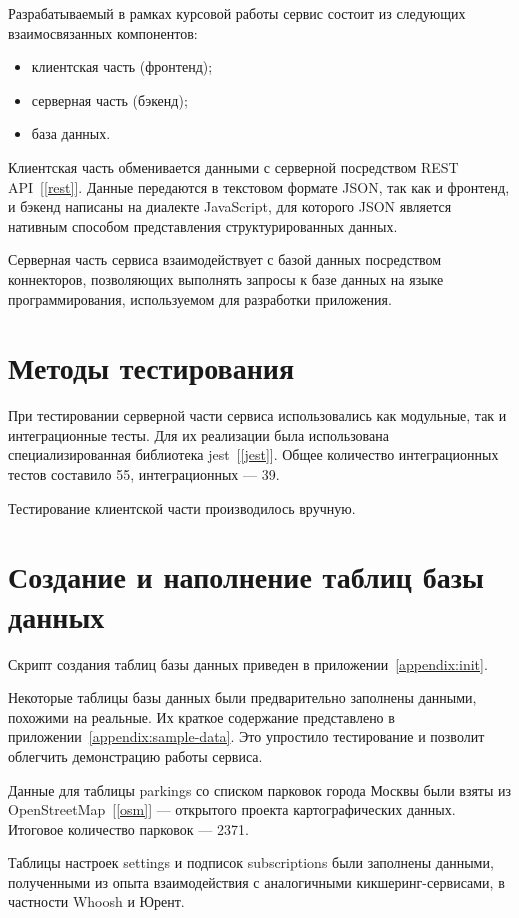 Разрабатываемый в рамках курсовой работы сервис состоит из следующих взаимосвязанных компонентов:

\begin{itemize}
    \item клиентская часть (фронтенд);
    \item серверная часть (бэкенд);
    \item база данных.
\end{itemize}

Клиентская часть обменивается данными с серверной посредством REST API~[\ref{rest}]. Данные передаются в текстовом формате JSON, так как и фронтенд, и бэкенд написаны на диалекте JavaScript, для которого JSON является нативным способом представления структурированных данных.

Серверная часть сервиса взаимодействует с базой данных посредством коннекторов, позволяющих выполнять запросы к базе данных на языке программирования, используемом для разработки приложения.

\section{Методы тестирования}

При тестировании серверной части сервиса использовались как модульные, так и интеграционные тесты. Для их реализации была использована специализированная библиотека jest~[\ref{jest}]. Общее количество интеграционных тестов составило 55, интеграционных --- 39.

Тестирование клиентской части производилось вручную.

\section{Создание и наполнение таблиц базы данных}

Скрипт создания таблиц базы данных приведен в приложении~\ref{appendix:init}.

Некоторые таблицы базы данных были предварительно заполнены данными, похожими на реальные. Их краткое содержание представлено в приложении~\ref{appendix:sample-data}. Это упростило тестирование и позволит облегчить демонстрацию работы сервиса.

Данные для таблицы parkings со списком парковок города Москвы были взяты из OpenStreetMap~[\ref{osm}] --- открытого проекта картографических данных. Итоговое количество парковок --- 2371.

Таблицы настроек settings и подписок subscriptions были заполнены данными, полученными из опыта взаимодействия с аналогичными кикшеринг-сервисами, в частности Whoosh и Юрент.

